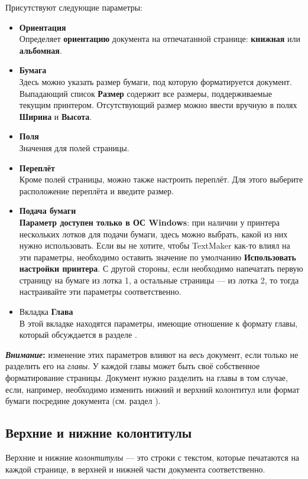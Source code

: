 ﻿\documentclass[a4paper,10pt]{article}
\begin{document}
Присутствуют следующие параметры:
\begin{itemize}
 \item \textbf{Ориентация}\\
 Определяет \textbf{ориентацию} документа на отпечатанной странице: \textbf{книжная} или \textbf{альбомная}.
 \item \textbf{Бумага}\\
 Здесь можно указать размер бумаги, под которую форматируется документ. Выпадающий список \textbf{Размер} содержит все размеры, поддерживаемые текущим принтером. Отсутствующий размер можно ввести вручную в полях \textbf{Ширина} и \textbf{Высота}.
 \item \textbf{Поля}\\
 Значения для полей страницы.
 \item \textbf{Переплёт}\\
 Кроме полей страницы, можно также настроить переплёт. Для этого выберите расположение переплёта и введите размер.
 \item \textbf{Подача бумаги}\\
 \textbf{Параметр доступен только в ОС Windows}: при наличии у принтера нескольких лотков для подачи бумаги, здесь можно выбрать, какой из них нужно использовать. Если вы не хотите, чтобы TextMaker как-то влиял на эти параметры, необходимо оставить значение по умолчанию \textbf{Использовать настройки принтера}. С другой стороны, если необходимо напечатать первую страницу на бумаге из лотка 1, а остальные страницы — из лотка 2, то тогда настраивайте эти параметры соответственно.
 \item Вкладка \textbf{Глава}\\
 В этой вкладке находятся параметры, имеющие отношение к формату главы, который обсуждается в разделе .
 \end{itemize}
 
 \begin{mdframed}[backgroundcolor=blue!10]
\textbf{\textit{Внимание}:} изменение этих параметров влияют на \textit{весь} документ, если только не разделить его на \textit{главы}. У каждой главы может быть своё собственное форматирование страницы. Документ нужно разделить на главы в том случае, если, например, необходимо изменить нижний и верхний колонтитул или формат бумаги посредине документа (см. раздел ).
\end{mdframed}

\subsection{Верхние и нижние колонтитулы}
Верхние и нижние \textit{колонтитулы} — это строки с текстом, которые печатаются на каждой странице, в верхней и нижней части документа соответственно.
\end{document}
